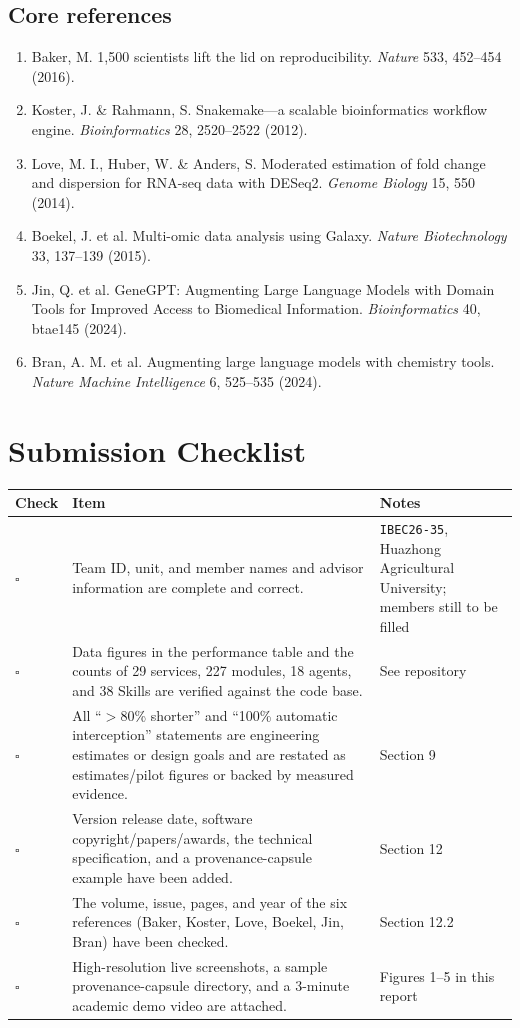 \documentclass[11pt,a4paper]{article}
\begin{document}
\subsection{Core references}

\begin{enumerate}
  \item Baker, M. 1,500 scientists lift the lid on reproducibility. \emph{Nature} 533, 452--454 (2016).
  \item Koster, J. \& Rahmann, S. Snakemake---a scalable bioinformatics workflow engine. \emph{Bioinformatics} 28, 2520--2522 (2012).
  \item Love, M. I., Huber, W. \& Anders, S. Moderated estimation of fold change and dispersion for RNA-seq data with DESeq2. \emph{Genome Biology} 15, 550 (2014).
  \item Boekel, J. et al. Multi-omic data analysis using Galaxy. \emph{Nature Biotechnology} 33, 137--139 (2015).
  \item Jin, Q. et al. GeneGPT: Augmenting Large Language Models with Domain Tools for Improved Access to Biomedical Information. \emph{Bioinformatics} 40, btae145 (2024).
  \item Bran, A. M. et al. Augmenting large language models with chemistry tools. \emph{Nature Machine Intelligence} 6, 525--535 (2024).
\end{enumerate}

\section{Submission Checklist}

\begin{tabularx}{\textwidth}{p{}X X}
\toprule
\textbf{Check} & \textbf{Item} & \textbf{Notes}\\
\midrule
$\square$ & Team ID, unit, and member names and advisor information are complete and correct. & \texttt{IBEC26-35}, Huazhong Agricultural University; members still to be filled\\
$\square$ & Data figures in the performance table and the counts of 29 services, 227 modules, 18 agents, and 38 Skills are verified against the code base. & See repository\\
$\square$ & All ``$>$80\% shorter'' and ``100\% automatic interception'' statements are engineering estimates or design goals and are restated as estimates/pilot figures or backed by measured evidence. & Section 9\\
$\square$ & Version release date, software copyright/papers/awards, the technical specification, and a provenance-capsule example have been added. & Section 12\\
$\square$ & The volume, issue, pages, and year of the six references (Baker, Koster, Love, Boekel, Jin, Bran) have been checked. & Section 12.2\\
$\square$ & High-resolution live screenshots, a sample provenance-capsule directory, and a 3-minute academic demo video are attached. & Figures 1--5 in this report\\
\bottomrule
\end{tabularx}
\end{document}

